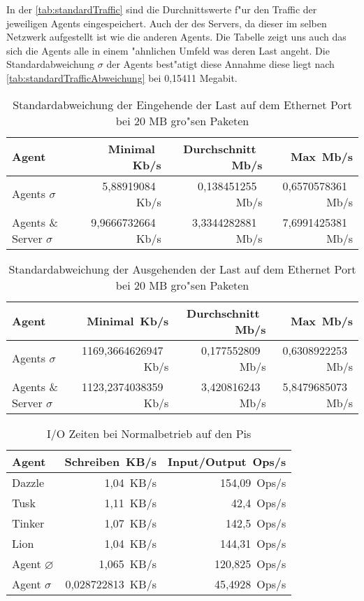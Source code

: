 In der \cref{tab:standardTraffic} sind die Durchnittswerte f"ur den Traffic der jeweiligen Agents eingespeichert. Auch der %
des Servers, da dieser im selben Netzwerk aufgestellt ist wie die anderen Agents. Die Tabelle zeigt uns auch %
das sich die Agents alle in einem "ahnlichen Umfeld was deren Last angeht. Die Standardabweichung $\sigma$ der Agents %
best"atigt diese Annahme diese liegt nach \cref{tab:standardTrafficAbweichung} bei 0,15411 Megabit.     

\begin{table}
\centering
\begin{tabular}{l%
 r<{\,Kb/s}%
 r<{\,Mb/s}%
 r<{\,Mb/s}%
}
Agent				& Minimal		& Durchschnitt          & Max		\\
\hline
Agents $\sigma $		& 5,88919084		& 0,138451255		& 0,6570578361	\\
Agents \& Server $\sigma $	& 9,9666732664		& 3,3344282881        	& 7,6991425381 	\\
\end{tabular}
\caption{Standardabweichung der Eingehende der Last auf dem Ethernet Port bei 20 MB gro"sen Paketen }
\label{tab:standardTrafficAbweichungEingehend20Mb}
\end{table}


\begin{table}
\centering
\begin{tabular}{l%
 r<{\,Kb/s}%
 r<{\,Mb/s}%
 r<{\,Mb/s}%
}
Agent				& Minimal		& Durchschnitt          & Max		\\
\hline
Agents $\sigma $		& 1169,3664626947	& 0,177552809		& 0,6308922253	\\
Agents \& Server $\sigma $	& 1123,2374038359	& 3,420816243        	& 5,8479685073 	\\
\end{tabular}
\caption{Standardabweichung der Ausgehenden der Last auf dem Ethernet Port bei 20 MB gro"sen Paketen }
\label{tab:standardTrafficAbweichungAusgehend20Mb}
\end{table}


\begin{table}
\centering
\begin{tabular}{l%
 r<{\,KB/s}%
 r<{\,Ops/s}%
}
Agent	  			& Schreiben	 	& Input/Output 	\\	
\hline
Dazzle 				& 1,04			& 154,09	        \\
Tusk 				& 1,11			& 42,4			\\
Tinker				& 1,07 			& 142,5		 	\\
Lion				& 1,04			& 144,31	 	\\
Agent $\diameter $  		& 1,065			& 120,825		\\   
Agent $\sigma $ 		& 0,028722813  		& 45,4928		\\
\end{tabular}
\caption{I/O Zeiten bei Normalbetrieb auf den Pis}
\label{tab:NormalbetriebIoStat20Mb}
\end{table}


